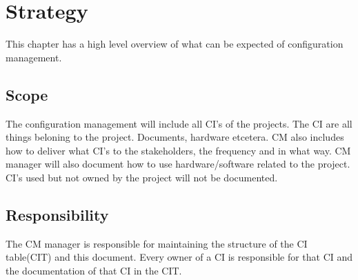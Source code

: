 \chapter{Strategy}
This chapter has a high level overview of what can be expected of configuration management.


\section{Scope}
The configuration management will include all CI's of the projects. The CI are all things beloning to the project. Documents, hardware etcetera. CM also includes how to deliver what CI's to the stakeholders, the frequency and in what way. CM manager will also document how to use hardware/software related to the project. CI's used but not owned by the project will not be documented.

\section{Responsibility}
The CM manager is responsible for maintaining the structure of the CI table(CIT) and this document. Every owner of a CI is responsible for that CI and the documentation of that CI in the CIT. 
